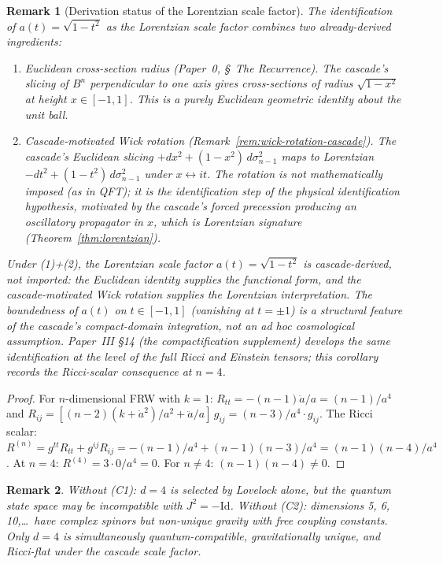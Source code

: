 \documentclass[12pt,a4paper]{article}
\newtheorem*{remark}{Remark}
\begin{document}
\begin{remark}[Derivation status of the Lorentzian scale factor]\label{rem:sp20-status}
The identification of $a(t) = \sqrt{1 - t^2}$ as the Lorentzian scale
factor combines two already-derived ingredients:
\begin{enumerate}
\item \emph{Euclidean cross-section radius (Paper~0, \S~The
Recurrence).} The cascade's slicing of $B^{n}$ perpendicular to one
axis gives cross-sections of radius $\sqrt{1-x^2}$ at height
$x\in[-1,1]$. This is a purely Euclidean geometric identity about
the unit ball.
\item \emph{Cascade-motivated Wick rotation
(Remark~\ref{rem:wick-rotation-cascade}).} The cascade's Euclidean
slicing $+dx^2 + (1-x^2)\,d\sigma_{n-1}^2$ maps to Lorentzian
$-dt^2 + (1-t^2)\,d\sigma_{n-1}^2$ under $x \leftrightarrow it$.
The rotation is not mathematically imposed (as in QFT); it is the
identification step of the physical identification hypothesis,
motivated by the cascade's forced precession producing an
oscillatory propagator in $x$, which is Lorentzian signature
(Theorem~\ref{thm:lorentzian}).
\end{enumerate}
Under (1)+(2), the Lorentzian scale factor $a(t) = \sqrt{1-t^2}$ is
cascade-derived, not imported: the Euclidean identity supplies the
functional form, and the cascade-motivated Wick rotation supplies
the Lorentzian interpretation. The boundedness of $a(t)$ on
$t\in[-1,1]$ (vanishing at $t = \pm 1$) is a structural feature of
the cascade's compact-domain integration, not an ad hoc cosmological
assumption. Paper~III \S14 (the compactification supplement) develops
the same identification at the level of the full Ricci and Einstein
tensors; this corollary records the Ricci-scalar consequence at
$n = 4$.
\end{remark}

\begin{proof}
For $n$-dimensional FRW with $k = 1$: $R_{tt} = -(n - 1)\ddot{a}/a = (n - 1)/a^4$ and
$R_{ij} = [(n - 2)(k + \dot{a}^2)/a^2 + \ddot{a}/a]\,g_{ij} = (n - 3)/a^4 \cdot g_{ij}$. The Ricci scalar: $R^{(n)} = g^{tt}R_{tt} + g^{ij}R_{ij} =
-(n - 1)/a^4 + (n - 1)(n - 3)/a^4 = (n - 1)(n - 4)/a^4$. At $n = 4$: $R^{(4)} = 3 \cdot 0/a^4 = 0$. For
$n \neq 4$: $(n - 1)(n - 4) \neq 0$.
\end{proof}

\begin{remark}
Without (C1): $d = 4$ is selected by Lovelock alone, but the quantum state
space may be incompatible with $J^2 = -\text{Id}$. Without (C2): dimensions 5, 6, 10,\ldots\ have
complex spinors but non-unique gravity with free coupling constants. Only $d = 4$ is
simultaneously quantum-compatible, gravitationally unique, and Ricci-flat under the cascade
scale factor.
\end{remark}
\end{document}
